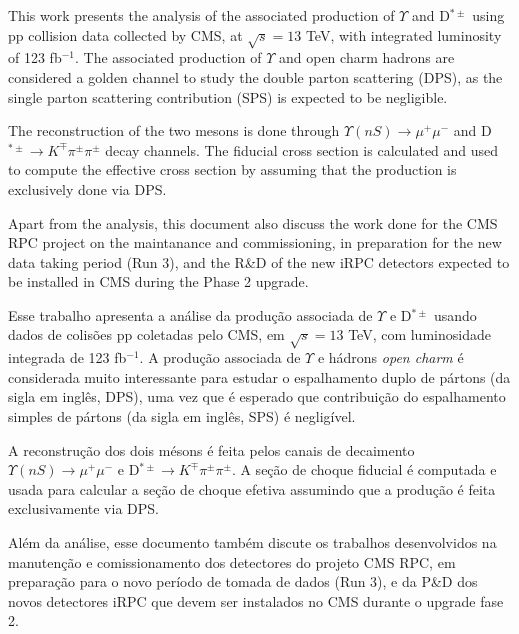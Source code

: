 
This work presents the analysis of the associated production of $\Upsilon$ and D$^{*\pm}$ using pp collision data collected by CMS, at $\sqrt{s} = 13$ TeV, with integrated luminosity of 123 fb$^{-1}$. The associated production of $\Upsilon$ and open charm hadrons are considered a golden channel to study the double parton scattering (DPS), as the single parton scattering contribution (SPS) is expected to be negligible.

The reconstruction of the two mesons is done through $\Upsilon(nS) \rightarrow \mu^+\mu^-$ and D$^{*\pm} \rightarrow K^\mp\pi^\pm \pi^\pm$ decay channels. The fiducial cross section is calculated and used to compute the effective cross section by assuming that the production is exclusively done via DPS.

Apart from the analysis, this document also discuss the work done for the CMS RPC project on the maintanance and commissioning, in preparation for the new data taking period (Run 3), and the R\&D of the new iRPC detectors expected to be installed in CMS during the Phase 2 upgrade.
~\\

\printkeys 


Esse trabalho apresenta a análise da produção associada de $\Upsilon$ e D$^{*\pm}$ usando dados de colisões pp coletadas pelo CMS, em $\sqrt{s} = 13$ TeV, com luminosidade integrada de 123 fb$^{-1}$. A produção associada de $\Upsilon$ e hádrons \textit{open charm} é considerada muito interessante para estudar o espalhamento duplo de pártons (da sigla em inglês, DPS),  uma vez que é esperado que contribuição do espalhamento simples de pártons (da sigla em inglês, SPS) é negligível.

A reconstrução dos dois mésons é feita pelos canais de decaimento $\Upsilon(nS) \rightarrow \mu^+\mu^-$ e D$^{*\pm} \rightarrow K^\mp\pi^\pm \pi^\pm$. A seção de choque fiducial é computada e usada para calcular a seção de choque efetiva assumindo que a produção é feita exclusivamente via DPS.

Além da análise, esse documento também discute os trabalhos desenvolvidos na manutenção e comissionamento dos detectores do projeto CMS RPC, em preparação para o novo período de tomada de dados (Run 3), e da P\&D dos novos detectores iRPC que devem ser instalados no CMS durante o upgrade fase 2.
~\\

\imprimirchaves 
